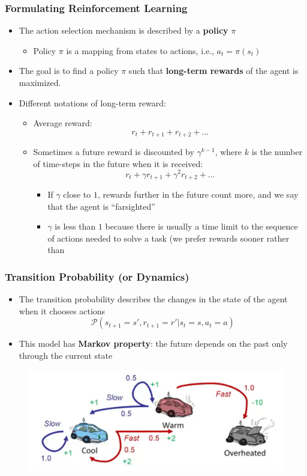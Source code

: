 \documentclass{beamer}
\newcommand{\PKernel}{\mathcal{P}}
\renewcommand{\high}{\textbf}
\begin{document}
\begin{frame}\frametitle{Formulating Reinforcement Learning}\small


\begin{itemize}
\item The action selection mechanism is described by a \high{policy} $\pi$
\begin{itemize}
\item Policy $\pi$ is a mapping from states to actions, i.e., $a_t = \pi(s_t)$
\end{itemize}
\item The goal is to find a policy $\pi$ such that \high{long-term rewards} of the agent is maximized. 
\item Different notations of long-term reward:
	\begin{itemize}
	\item
	Average reward:
	\[
	r_{t}+r_{t+1}+r_{t+2}+\dots
	\]
	\item Sometimes a future reward is discounted by $\gamma^{k-1}$, where $k$ is the number of time-steps in the future when it is received:
		\[
	r_{t}+\gamma r_{t+1}+\gamma^2 r_{t+2}+\dots
	\]
		\begin{itemize}
			\item If $\gamma$ close to $1$, rewards further in the future count more, and we say that the agent is ``farsighted''
			\item $\gamma$ is less than $1$ because there is usually a time limit to the sequence of actions needed to solve a task (we prefer rewards sooner rather than 
		\end{itemize}
	\end{itemize}
\end{itemize}
\end{frame}


\begin{frame}\frametitle{Transition Probability (or Dynamics)}\small
\begin{itemize}
\item The transition probability describes the changes in the state of the agent when it chooses actions
\[
	\PKernel(s_{t+1}=s', r_{t+1}=r' | s_t = s, a_t = a)
\]
%
\item This model has \high{Markov property}: the future depends on the past only through the current state
%
\end{itemize}
\begin{figure}
\includegraphics[width=0.7\linewidth]{Figures/rll6} 
\end{figure}
\end{frame}
\end{document}
